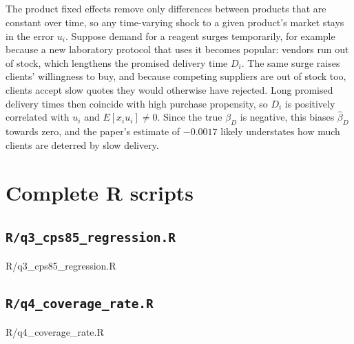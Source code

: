 \documentclass[11pt]{article}
\newcommand{\code}[1]{\texttt{#1}}
\begin{document}
\subsection{}
The product fixed effects remove only differences between products that are
constant over time, so any time-varying shock to a given product's market stays
in the error $u_i$. Suppose demand for a reagent surges temporarily, for
example because a new laboratory protocol that uses it becomes popular:
vendors run out of stock, which lengthens the promised delivery time $D_i$.
The same surge raises clients' willingness to buy, and because competing
suppliers are out of stock too, clients accept slow quotes they would otherwise
have rejected. Long promised delivery times then coincide with high purchase
propensity, so $D_i$ is positively correlated with $u_i$ and
$E[x_i u_i] \neq 0$. Since the true $\beta_D$ is negative, this biases
$\hat\beta_D$ towards zero, and the paper's estimate of $-0.0017$ likely
understates how much clients are deterred by slow delivery.

\clearpage
\appendix
\section{Complete R scripts}

\subsection{\texorpdfstring{\code{R/q3\_cps85\_regression.R}}{R/q3\_cps85\_regression.R}}
%
{R/q3_cps85_regression.R}

\subsection{\texorpdfstring{\code{R/q4\_coverage\_rate.R}}{R/q4\_coverage\_rate.R}}
%
{R/q4_coverage_rate.R}
\end{document}
